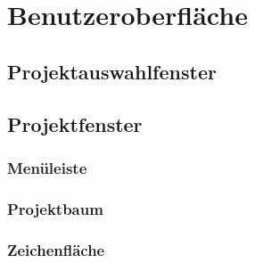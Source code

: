 
\section{Benutzeroberfläche}

\subsection{Projektauswahlfenster}

\subsection{Projektfenster}
\subsubsection{Menüleiste}
\subsubsection{Projektbaum}
\subsubsection{Zeichenfläche}
